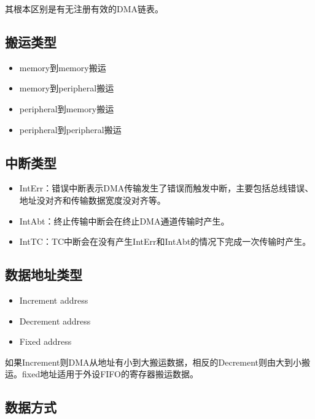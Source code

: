 \documentclass[
  12pt,
]{book}
\begin{document}
其根本区别是有无注册有效的DMA链表。

\hypertarget{ux642cux8fd0ux7c7bux578b}{%
\subsection{搬运类型}\label{ux642cux8fd0ux7c7bux578b}}

\begin{itemize}
\item
  memory到memory搬运
\item
  memory到peripheral搬运
\item
  peripheral到memory搬运
\item
  peripheral到peripheral搬运
\end{itemize}

\hypertarget{ux4e2dux65adux7c7bux578b}{%
\subsection{中断类型}\label{ux4e2dux65adux7c7bux578b}}

\begin{itemize}
\item
  IntErr：错误中断表示DMA传输发生了错误而触发中断，主要包括总线错误、地址没对齐和传输数据宽度没对齐等。
\item
  IntAbt：终止传输中断会在终止DMA通道传输时产生。
\item
  IntTC：TC中断会在没有产生IntErr和IntAbt的情况下完成一次传输时产生。
\end{itemize}

\hypertarget{ux6570ux636eux5730ux5740ux7c7bux578b}{%
\subsection{数据地址类型}\label{ux6570ux636eux5730ux5740ux7c7bux578b}}

\begin{itemize}
\item
  Increment address
\item
  Decrement address
\item
  Fixed address
\end{itemize}

如果Increment则DMA从地址有小到大搬运数据，相反的Decrement则由大到小搬运。fixed地址适用于外设FIFO的寄存器搬运数据。

\hypertarget{ux6570ux636eux65b9ux5f0f}{%
\subsection{数据方式}\label{ux6570ux636eux65b9ux5f0f}}
\end{document}

